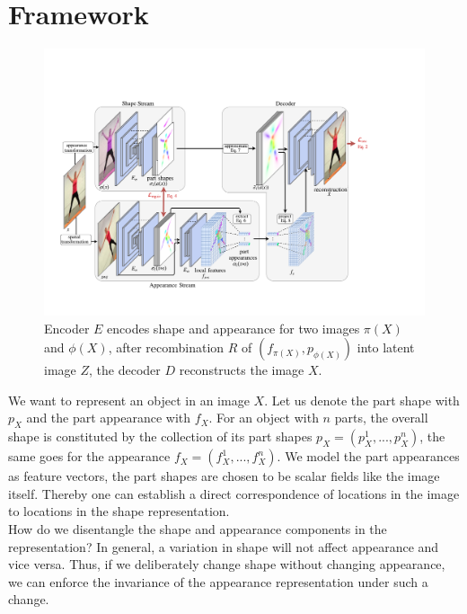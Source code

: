 \section{Framework}\label{sec:framework}
	\begin{figure}[t]
		\centering
		\includegraphics[trim={0cm 0cm 0cm 0cm},clip, width=1.\linewidth]{fig/architecture_final}
		\caption{Encoder $E$ encodes shape and appearance for two images $\pi(X)$ and $\phi(X)$, after recombination $R$ of $(f_{\pi(X)}, p_{\phi(X)})$ into latent image $Z$, the decoder $D$ reconstructs the image $X$.}
		\label{fig:architecture}
	\end{figure}
	We want to represent an object in an image $X$. Let us denote the part shape with $p_X$ and the part appearance with $f_X$. For an object with $n$ parts, the overall shape is constituted by the collection of its part shapes $p_X =  (p^1_X, ...,  p^n_X)$, the same goes for the appearance $f_X =  (f^1_X, ...,  f^n_X)$. We model the part appearances as feature vectors, the part shapes are chosen to be scalar fields like the image itself. Thereby one can establish a direct correspondence of locations in the image to locations in the shape representation.\\
	How do we disentangle the shape and appearance components in the representation? In general, a variation in shape will not affect appearance and vice versa. Thus, if we deliberately change shape without changing appearance, we can enforce the invariance of the appearance representation under such a change.

